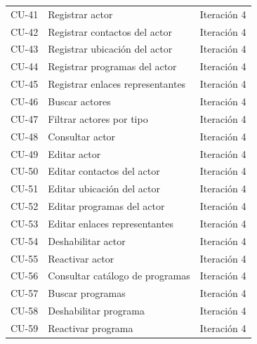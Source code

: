 \begin{center}
\begin{longtable}{|c|p{}|c|}
		\hline
		CU-41  & Registrar actor                          & Iteración 4  \\
		CU-42  & Registrar contactos del actor            & Iteración 4  \\
		CU-43  & Registrar ubicación del actor            & Iteración 4  \\
		CU-44  & Registrar programas del actor            & Iteración 4  \\
		CU-45 & Registrar enlaces representantes         & Iteración 4  \\
		CU-46   & Buscar actores                           & Iteración 4  \\
		CU-47 & Filtrar actores por tipo                 & Iteración 4  \\
		CU-48   & Consultar actor                          & Iteración 4  \\
		CU-49   & Editar actor                             & Iteración 4  \\
		CU-50  & Editar contactos del actor               & Iteración 4  \\
		CU-51 & Editar ubicación del actor               & Iteración 4  \\
		CU-52 & Editar programas del actor               & Iteración 4  \\
		CU-53 & Editar enlaces representantes            & Iteración 4  \\
		CU-54 & Deshabilitar actor                       & Iteración 4  \\
		CU-55   & Reactivar actor                          & Iteración 4  \\
		CU-56   & Consultar catálogo de programas          & Iteración 4  \\
		CU-57 & Buscar programas                         & Iteración 4  \\
		CU-58   & Deshabilitar programa                    & 
		Iteración 4  \\
		CU-59   & Reactivar programa                       & 
		Iteración 4  \\
		\hline
	\end{longtable}
\end{center}


